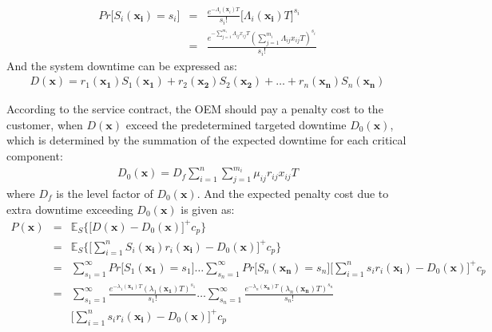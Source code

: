 \documentclass[preprint,12pt]{elsarticle}
\begin{document}
\begin {eqnarray}
Pr\bigg[S_{i}(\boldsymbol{x_i})=s_{i}\bigg]&=&\frac{e^{-\Lambda_{i}(\boldsymbol x_{i})T}}{s_{i}!}{\bigg[\Lambda_{i}(\boldsymbol{x_{i}})T\bigg]}^{s_{i}} \nonumber\\
&=& \frac{e^{-\sum_{j=1}^{m_{i}}{\Lambda_{ij}x_{ij}T}}(\sum_{j=1}^{m_{i}}{\Lambda_{ij}x_{ij}T})^{s_{i}}}{s_{i}!}
\end {eqnarray}
And the system downtime can be expressed as:
\begin{eqnarray}
D(\boldsymbol{x})= r_{1}(\boldsymbol{x_{1}})S_{1}(\boldsymbol{x_{1}})+r_{2}(\boldsymbol{x_{2}})S_{2}(\boldsymbol{x_{2}})+\ldots+r_{n}(\boldsymbol{x_{n}})S_{n}(\boldsymbol{x_{n}})
\label{D}
\end{eqnarray}

According to the service contract, the OEM should pay a penalty cost to the customer, when $D(\boldsymbol{x})$ exceed the predetermined targeted downtime $D_{0}(\boldsymbol{x})$, which is determined by the summation of the expected downtime for each critical component:
\begin{eqnarray}
D_{0}(\boldsymbol{x}) = D_{f}\sum_{i=1}^{n}{\sum_{j=1}^{m_{i}}{\mu_{ij}r_{ij}x_{ij}T}} \label{D0}
\end{eqnarray}
where $D_{f}$ is the level factor of $D_{0}(\boldsymbol{x})$.
And the expected penalty cost due to extra downtime exceeding $D_{0}(\boldsymbol{x})$ is given as:
\begin{eqnarray}
P(\boldsymbol{x})& = & \mathbb{E}_{S}\bigg\{\bigg[D(\boldsymbol{x})-D_{0}(\boldsymbol{x})\bigg]^{+} c_{p} \bigg\} \nonumber\\
&=& \mathbb{E}_{S}\bigg\{\bigg[\sum_{i=1}^{n}{S_{i}(\boldsymbol{x_{i}})r_{i}(\boldsymbol{x_i})}-D_{0}(\boldsymbol{x})\bigg]^{+} c_{p} \bigg\} \nonumber\\
&=&\sum_{s_{1}=1}^{\infty}{Pr\bigg[S_{1}(\boldsymbol{x_{1}})=s_{1}\bigg]}\dots\sum_{s_{n}=1}^{\infty}{Pr\bigg[S_{n}(\boldsymbol{x_{n}})=s_{n}\bigg]} \bigg[\sum_{i=1}^{n}{s_{i}r_{i}(\boldsymbol{x_{i}})}-D_{0}(\boldsymbol{x})\bigg]^{+}c_{p} \nonumber\\
&=& \sum_{s_{1}=1}^{\infty}{\frac{e^{-\lambda_{1}(\boldsymbol{x_{1}})T}(\lambda_{1}(\boldsymbol{x_{1}})T)^{s_{1}}}{s_{1}!}}\dots\sum_{s_{n}=1}^{\infty}{\frac{e^{-\lambda_{n}(\boldsymbol{x_{n}})T}(\lambda_{n}(\boldsymbol{x_{n}})T)^{s_{n}}}{s_{n}!}} \nonumber\\
 &&\bigg[\sum_{i=1}^{n}{s_{i}r_{i}(\boldsymbol{x_{i}})}-D_{0}(\boldsymbol{x})\bigg]^{+}c_{p}
\end{eqnarray}
\end{document}
